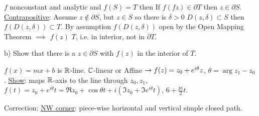 \documentclass[]{article}
\begin{document}
\begin{example} [HW\#3(a)]
	$f$ nonconstant and analytic and $f(S) = T$ then If $f(fz) \in \partial T$ then $z\in \partial S$.
	\underline{Contrapositive}: Assume $z\notin \partial S$, but $z\in S$ so there is $\delta>0$ $D(z,\delta)\subset S$ then $f(D(z,\delta)) \subset T$. By assumption $f(D(z,\delta))$ open by the Open Mapping Theorem $\implies$ $f(z)$  $T$, i.e. in interior, not in $\partial T$.
	
	b) Show that there is a $z\in \partial S$ with $f(z)$ in the interior of $T$.
\end{example}
\begin{example}
	[HW \#15] $f(x) = mx + b$ is $\mathbb{R}$-line. $\mathbb{C}$-linear or Affine $\rightarrow f(z) = z_0 + e^{i\theta} z$, $\theta = \arg{z_1-z_0}$. \underline{Show}: maps $\mathbb{R}$-axis to the line through $z_0, z_1$, $f(t) = z_0 + e^{i\theta} t = \Re z_0 + \cos{\theta t} + i(\Im z_0 + \Im e^{i\theta}t)$, $6 + \frac{pi}{2}t$.
\end{example}
Correction: \underline{NW corner}: piece-wise horizontal and vertical simple closed path.
\end{document}
